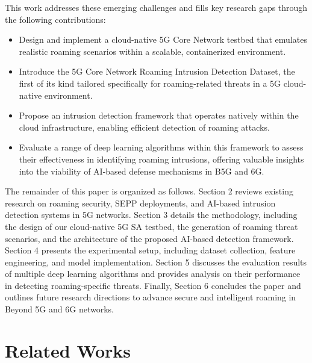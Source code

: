 \documentclass[journal,article,submit,moreauthors,pdftex]{Definitions/tsp}
\begin{document}
This work addresses these emerging challenges and fills key research gaps through the following contributions:
\begin{itemize}
    \item Design and implement a cloud-native 5G Core Network testbed that emulates realistic roaming scenarios within a scalable, containerized environment.
    \item Introduce the 5G Core Network Roaming Intrusion Detection Dataset, the first of its kind tailored specifically for roaming-related threats in a 5G cloud-native environment.
    \item Propose an intrusion detection framework that operates natively within the cloud infrastructure, enabling efficient detection of roaming attacks.
    \item Evaluate a range of deep learning algorithms within this framework to assess their effectiveness in identifying roaming intrusions, offering valuable insights into the viability of AI-based defense mechanisms in B5G and 6G.
\end{itemize}

The remainder of this paper is organized as follows. Section 2 reviews existing research on roaming security, SEPP deployments, and AI-based intrusion detection systems in 5G networks. Section 3 details the methodology, including the design of our cloud-native 5G SA testbed, the generation of roaming threat scenarios, and the architecture of the proposed AI-based detection framework. Section 4 presents the experimental setup, including dataset collection, feature engineering, and model implementation. Section 5 discusses the evaluation results of multiple deep learning algorithms and provides analysis on their performance in detecting roaming-specific threats. Finally, Section 6 concludes the paper and outlines future research directions to advance secure and intelligent roaming in Beyond 5G and 6G networks.

\section{Related Works}

\end{document}
